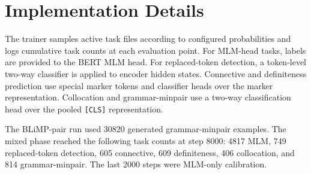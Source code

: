 \documentclass[11pt]{article}
\begin{document}


\appendix
\section{Implementation Details}

The trainer samples active task files according to configured probabilities and logs cumulative task counts at each evaluation point. For MLM-head tasks, labels are provided to the BERT MLM head. For replaced-token detection, a token-level two-way classifier is applied to encoder hidden states. Connective and definiteness prediction use special marker tokens and classifier heads over the marker representation. Collocation and grammar-minpair use a two-way classification head over the pooled \texttt{[CLS]} representation.

The BLiMP-pair run used 30820 generated grammar-minpair examples. The mixed phase reached the following task counts at step 8000: 4817 MLM, 749 replaced-token detection, 605 connective, 609 definiteness, 406 collocation, and 814 grammar-minpair. The last 2000 steps were MLM-only calibration.
\end{document}
